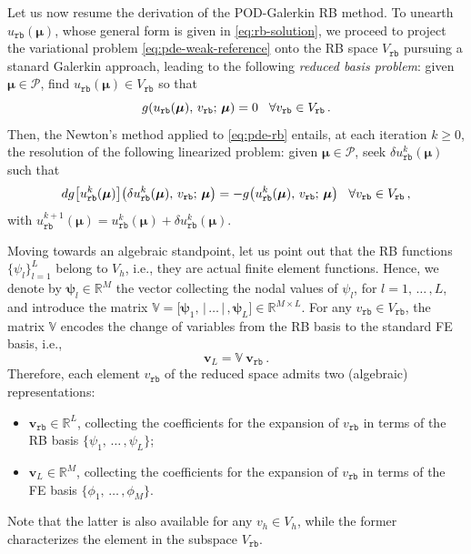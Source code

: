 \documentclass[12pt, a4paper, twoside, openright]{report}
\numberwithin{equation}{chapter}
\theoremstyle{theorem}
\theoremstyle{definition}
\theoremstyle{remark}
\theoremstyle{proposition}
\numberwithin{figure}{chapter}
\newcommand{\bg}[1]{\boldsymbol{#1}}
\begin{document}
		Let us now resume the derivation of the POD-Galerkin RB method. To unearth $u_{\texttt{rb}}(\bg{\mu})$, whose general form is given in \eqref{eq:rb-solution}, we proceed to project the variational problem \eqref{eq:pde-weak-reference} onto the RB space $V_{\texttt{rb}}$ pursuing a stanard Galerkin approach, leading to the following \emph{reduced basis problem}: given $\bg{\mu} \in \mathcal{P}$, find $u_{\texttt{rb}}(\bg{\mu}) \in V_{\texttt{rb}}$ so that
		\begin{equation}
			\label{eq:pde-rb}
			g(u_{\texttt{rb}}(\bg{\mu}), \, v_{\texttt{rb}}; \, \bg{\mu}) = 0 \hspace*{0.3cm} \forall v_{\texttt{rb}} \in V_{\texttt{rb}} \, .
		\end{equation}
		Then, the Newton's method applied to \eqref{eq:pde-rb} entails, at each iteration $k \geq 0$, the resolution of the following linearized problem: given $\bg{\mu} \in \mathcal{P}$, seek $\delta u_{\texttt{rb}}^k(\bg{\mu})$ such that
		\begin{equation}
			\label{eq:pde-rb-newton}
			dg \big[ u_{\texttt{rb}}^k(\bg{\mu}) \big] \big( \delta u_{\texttt{rb}}^k(\bg{\mu}), \, v_{\texttt{rb}}; \, \bg{\mu} \big) = - g \big( u_{\texttt{rb}}^k(\bg{\mu}), \, v_{\texttt{rb}}; \, \bg{\mu} \big) \hspace*{0.3cm} \forall v_{\texttt{rb}} \in V_{\texttt{rb}} \, ,
		\end{equation}
		with $u_{\texttt{rb}}^{k+1}(\bg{\mu}) = u_{\texttt{rb}}^k(\bg{\mu}) + \delta u_{\texttt{rb}}^k(\bg{\mu})$.
		
		Moving towards an algebraic standpoint, let us point out that the RB functions $\big\lbrace \psi_l \big\rbrace_{l = 1}^L$ belong to $V_h$, i.e., they are actual finite element functions. Hence, we denote by $\bg{\psi}_l \in \mathbb{R}^M$ the vector collecting the nodal values of $\psi_l$, for $l = 1, \, \ldots \, , L$, and introduce the matrix $\mathbb{V} = \big[ \bg{\psi}_1, \, \big| \, \ldots \, \big| \, , \bg{\psi}_L \big] \in \mathbb{R}^{M \times L}$. For any $v_{\texttt{rb}} \in V_{\texttt{rb}}$, the matrix $\mathbb{V}$ encodes the change of variables from the RB basis to the standard FE basis, i.e.,
		\begin{equation}
			\label{eq:rb-fe-coefficients}
			\mathbf{v}_L = \mathbb{V} ~ \mathbf{v}_{\texttt{rb}} \, .
		\end{equation}
		Therefore, each element $v_{\texttt{rb}}$ of the reduced space admits two (algebraic) representations:
		\begin{itemize}
			\item $\mathbf{v}_{\texttt{rb}} \in \mathbb{R}^L$, collecting the coefficients for the expansion of $v_{\texttt{rb}}$ in terms of the RB basis $\big\lbrace \psi_1, \, \ldots \, , \psi_L \big\rbrace$;
			\item $\mathbf{v}_{L} \in \mathbb{R}^M$, collecting the coefficients for the expansion of $v_{\texttt{rb}}$ in terms of the FE basis $\big\lbrace \phi_1, \, \ldots \, , \phi_M \big\rbrace$.
		\end{itemize}
		Note that the latter is also available for any $v_h \in V_h$, while the former characterizes the element in the subspace $V_{\texttt{rb}}$.
		
\end{document}
